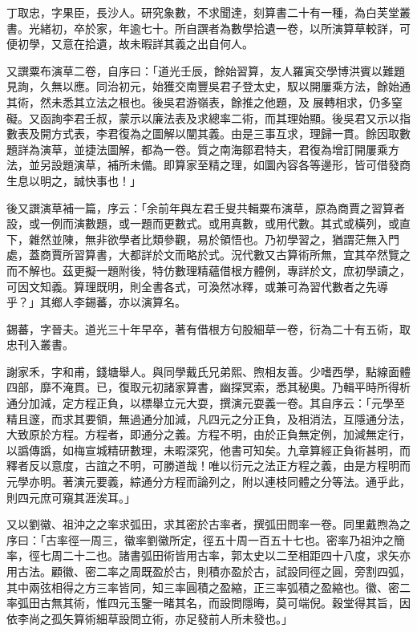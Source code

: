 \begin{pinyinscope}
丁取忠，字果臣，長沙人。研究象數，不求聞達，刻算書二十有一種，為白芙堂叢書。光緒初，卒於家，年逾七十。所自譔者為數學拾遺一卷，以所演算草較詳，可便初學，又意在拾遺，故未暇詳其義之出自何人。

又譔粟布演草二卷，自序曰：「道光壬辰，餘始習算，友人羅寅交學博洪賓以難題見詢，久無以應。同治初元，始獲交南豐吳君子登太史，馭以開屢乘方法，餘始通其術，然未悉其立法之根也。後吳君游嶺表，餘推之他題，及展轉相求，仍多窒礙。又函詢李君壬叔，蒙示以廉法表及求總率二術，而其理始顯。後吳君又示以指數表及開方式表，李君復為之圖解以闡其義。由是三事互求，理歸一貫。餘因取數題詳為演草，並捷法圖解，都為一卷。質之南海鄒君特夫，君復為增訂開屢乘方法，並另設題演草，補所未備。即算家至精之理，如圜內容各等邊形，皆可借發商生息以明之，誠快事也！」

後又譔演草補一篇，序云：「余前年與左君壬叟共輯粟布演草，原為商賈之習算者設，或一例而演數題，或一題而更數式。或用真數，或用代數。其式或橫列，或直下，雜然並陳，無非欲學者比類參觀，易於領悟也。乃初學習之，猶謂茫無入門處，蓋商賈所習算書，大都詳於文而略於式。況代數又古算術所無，宜其卒然覽之而不解也。茲更擬一題附後，特仿數理精蘊借根方體例，專詳於文，庶初學讀之，可因文知義。算理既明，則全書各式，可渙然冰釋，或兼可為習代數者之先導乎？」其鄉人李錫蕃，亦以演算名。

錫蕃，字晉夫。道光三十年早卒，著有借根方句股細草一卷，衍為二十有五術，取忠刊入叢書。

謝家禾，字和甫，錢塘舉人。與同學戴氏兄弟熙、煦相友善。少嗜西學，點線面體四部，靡不淹貫。已，復取元初諸家算書，幽探冥索，悉其秘奧。乃輯平時所得析通分加減，定方程正負，以標舉立元大耍，撰演元耍義一卷。其自序云：「元學至精且邃，而求其要領，無過通分加減，凡四元之分正負，及相消法，互隱通分法，大致原於方程。方程者，即通分之義。方程不明，由於正負無定例，加減無定行，以譌傳譌，如梅宣城精研數理，未暇深究，他書可知矣。九章算經正負術甚明，而釋者反以意度，古誼之不明，可勝道哉！唯以衍元之法正方程之義，由是方程明而元學亦明。著演元要義，綜通分方程而論列之，附以連枝同體之分等法。通乎此，則四元庶可窺其涯涘耳。」

又以劉徽、祖沖之之率求弧田，求其密於古率者，撰弧田問率一卷。同里戴煦為之序曰：「古率徑一周三，徽率劉徽所定，徑五十周一百五十七也。密率乃祖沖之簡率，徑七周二十二也。諸書弧田術皆用古率，郭太史以二至相距四十八度，求矢亦用古法。顧徽、密二率之周既盈於古，則積亦盈於古，試設同徑之圓，旁割四弧，其中兩弦相得之方三率皆同，知三率圓積之盈縮，正三率弧積之盈縮也。徽、密二率弧田古無其術，惟四元玉鑒一睹其名，而設問隱晦，莫可端倪。穀堂得其旨，因依李尚之孤矢算術細草設問立術，亦足發前人所未發也。」


\end{pinyinscope}
